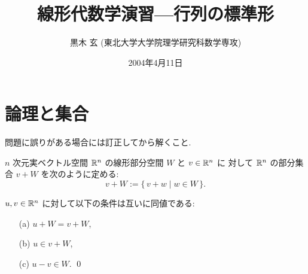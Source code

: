 \documentclass[12pt,twoside]{jarticle}
\begin{document}

\title{\bf 線形代数学演習---行列の標準形
  }

\author{黒木 玄 \quad (東北大学大学院理学研究科数学専攻)}

\date{2004年4月11日}

\maketitle

\tableofcontents


\section{論理と集合}

問題に誤りがある場合には訂正してから解くこと.


$n$ 次元実ベクトル空間 ${\mathbb R}^n$ の線形部分空間 $W$ と $v\in{\mathbb R}^n$ に
対して ${\mathbb R}^n$ の部分集合 $v+W$ を次のように定める:
\begin{equation*}
  v + W := \{\, v+w \mid w\in W \,\}.
\end{equation*}

\begin{question}[10点]
  $u,v \in{\mathbb R}^n$ に対して以下の条件は互いに同値である:
  \begin{itemize}
  \item[(a)] $u+W = v+W$,
  \item[(b)] $u \in v+W$,
  \item[(c)] $u-v \in W$.
    \qed
  \end{itemize}
\end{question}
\end{document}
